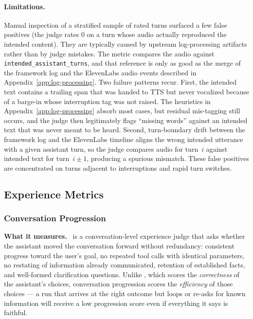 \paragraph{Limitations.} Manual inspection of a stratified sample of rated turns surfaced a few false positives (the judge rates $0$ on a turn whose audio actually reproduced the intended content). They are typically caused by upstream log-processing artifacts rather than by judge mistakes. The metric compares the audio against \texttt{intended\_assistant\_turns}, and that reference is only as good as the merge of the framework log and the ElevenLabs audio events described in Appendix~\ref{app:log-processing}. Two failure patterns recur. First, the intended text contains a trailing span that was handed to TTS but never vocalized because of a barge-in whose interruption tag was not raised. The heuristics in Appendix~\ref{app:log-processing} absorb most cases, but residual mis-tagging still occurs, and the judge then legitimately flags ``missing words'' against an intended text that was never meant to be heard. Second, turn-boundary drift between the framework log and the ElevenLabs timeline aligns the wrong intended utterance with a given assistant turn, so the judge compares audio for turn~$i$ against intended text for turn~$i{\pm}1$, producing a spurious mismatch. These false positives are concentrated on turns adjacent to interruptions and rapid turn switches.

\subsection{Experience Metrics}

\subsubsection{Conversation Progression}
\label{app:metric-conversation-progression}

\textbf{What it measures.} \metricconversationprogression~is a conversation-level experience judge that asks whether the assistant moved the conversation forward without redundancy: consistent progress toward the user's goal, no repeated tool calls with identical parameters, no restating of information already communicated, retention of established facts, and well-formed clarification questions. Unlike \metricfaithfulness, which scores the \emph{correctness} of the assistant's choices, conversation progression scores the \emph{efficiency} of those choices --- a run that arrives at the right outcome but loops or re-asks for known information will receive a low progression score even if everything it says is faithful.

